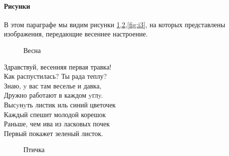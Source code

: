 \documentclass[a4paper,12pt]{article}         %
\begin{document}
\paragraph{Рисунки} В этом параграфе мы видим рисунки \ref{fig:i1},\ref{fig:i2},\ref{fig:i3}, на которых представлены изображения, передающие весеннее настроение.
\begin{figure}[h]
	\caption{Весна}
	\label{fig:i1}
\end{figure}
\begin{center}
Здравствуй, весенняя первая травка!
\\Как распустилась? Ты рада теплу?
\\Знаю, y вас там веселье и давка,
\\Дружно работают в каждом yглy.
\\Высyнyть листик иль синий цветочек
\\Каждый спешит молодой корешок
\\Раньше, чем ива из ласковых почек
\\Первый покажет зеленый листок.
\end{center}
\begin{figure}[t]
	\caption{Птичка}
	\label{fig:i2}
\end{figure}
\end{document}

